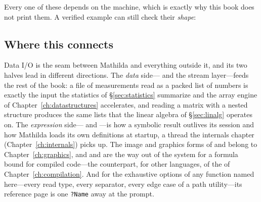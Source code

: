 \noindent
Every one of these depends on the machine, which is exactly why this book does not
print them. A verified example can still check their \emph{shape}:

\begin{codepairs}
\end{codepairs}

\subsection*{Where this connects}

Data I/O is the seam between Mathilda and everything outside it, and its two
halves lead in different directions. The \emph{data} side--- and the
stream layer---feeds the rest of the book: a file of measurements read as a packed
list of numbers is exactly the input the statistics of \S\ref{sec:statistics}
summarize and the array engine of Chapter~\ref{ch:datastructures} accelerates,
and reading a matrix with a nested  structure produces the same lists that
the linear algebra of \S\ref{sec:linalg} operates on. The \emph{expression}
side--- and ---is how a symbolic result outlives its session and how
Mathilda loads its own definitions at startup, a thread the internals chapter
(Chapter~\ref{ch:internals}) picks up. The image and graphics forms of 
and  belong to Chapter~\ref{ch:graphics}, and  and
 are the way out of the system for a formula bound for compiled
code---the counterpart, for other languages, of the  of
Chapter~\ref{ch:compilation}. And for the exhaustive
options of any function named here---every read type, every separator, every
edge case of a path utility---its reference page is one \texttt{?Name} away at the
prompt.
